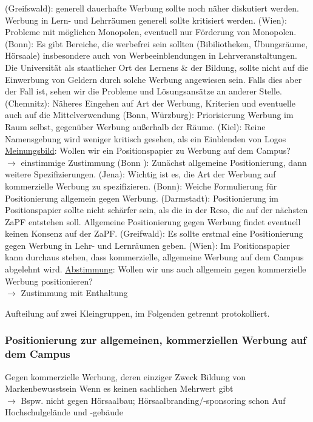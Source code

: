 \begin{outline}
			\1 (Greifswald): generell dauerhafte Werbung sollte noch näher diskutiert werden. Werbung in Lern- und Lehrräumen generell sollte kritisiert werden.
			\1 (Wien): Probleme mit möglichen Monopolen, eventuell nur Förderung von Monopolen.
			\1 (Bonn): Es gibt Bereiche, die werbefrei sein sollten (Bibiliotheken, Übungsräume, Hörsaale) insbesondere auch von Werbeeinblendungen in Lehrveranstaltungen. Die Universität als staatlicher Ort des Lernens \& der Bildung, sollte nicht auf die Einwerbung von Geldern durch solche Werbung angewiesen sein. Falls dies aber der Fall ist, sehen wir die Probleme und Lösungsansätze an anderer Stelle.
			\1 (Chemnitz): Näheres Eingehen auf Art der Werbung, Kriterien und eventuelle auch auf die  Mittelverwendung
			\1 (Bonn, Würzburg): Priorisierung Werbung im Raum selbst, gegenüber Werbung außerhalb der Räume.
			\1 (Kiel): Reine Namensgebung wird weniger kritisch gesehen, als ein Einblenden von Logos
			\1 \underline{Meinungsbild}: Wollen wir ein Positionspapier zu Werbung auf dem Campus? \\ $\rightarrow$ einstimmige Zustimmung
			\1 (Bonn ): Zunächst allgemeine Positionierung, dann weitere Spezifizierungen.
			\1 (Jena): Wichtig ist es, die Art der Werbung auf kommerzielle Werbung zu spezifizieren.
			\1 (Bonn): Weiche Formulierung für Positionierung allgemein gegen Werbung.
			\1 (Darmstadt): Positionierung im Positionspapier sollte nicht schärfer sein, als die in der Reso, die auf der nächsten ZaPF entstehen soll. Allgemeine Positionierung gegen Werbung findet eventuell keinen Konsenz auf der ZaPF.
			\1 (Greifwald):  Es sollte erstmal eine Positionierung gegen Werbung in Lehr- und Lernräumen geben.
			\1 (Wien): Im Positionspapier kann durchaus stehen, dass kommerzielle, allgemeine Werbung auf dem Campus abgelehnt wird.
			\1 \underline{Abstimmung}: Wollen wir uns auch allgemein gegen kommerzielle Werbung positionieren? \\ $\rightarrow$ Zustimmung mit Enthaltung
		\end{outline}
		Aufteilung auf zwei Kleingruppen, im Folgenden getrennt protokolliert.

		\subsubsection*{Positionierung zur allgemeinen, kommerziellen Werbung auf dem Campus}
			\begin{outline}
				\1 Gegen kommerzielle Werbung, deren einziger Zweck Bildung von Markenbewusstsein
				\1 Wenn es keinen sachlichen Mehrwert gibt \\
				$\rightarrow$ Bspw. nicht gegen Hörsaalbau; Hörsaalbranding/-sponsoring schon
				\1 Auf Hochschulgelände und -gebäude
			\end{outline}

